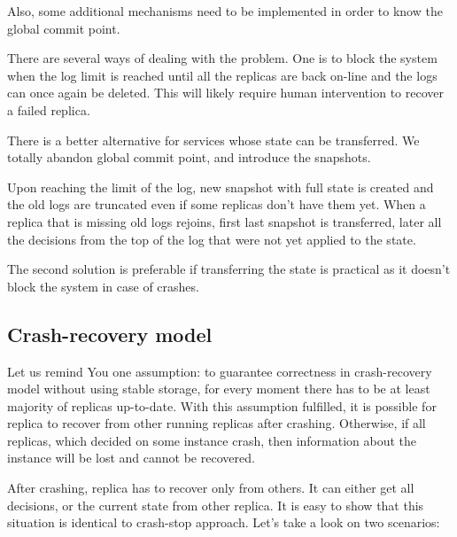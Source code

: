 Also, some additional mechanisms need to be implemented in order to know the global commit point.

There are several ways of dealing with the problem. One is to block the system when the log limit is reached until all the replicas are back on-line and the logs can once again be deleted. This will likely require human intervention to recover a failed replica.

There is a better alternative for services whose state can be transferred. We totally abandon global commit point, and introduce the snapshots.

Upon reaching the limit of the log, new snapshot with full state is created and the old logs are truncated even if some replicas don't have them yet. When a replica that is missing old logs rejoins, first last snapshot is transferred, later all the decisions from the top of the log that were not yet applied to the state.

The second solution is preferable if transferring the state is practical as it doesn't block the system in case of crashes.

\subsection{Crash-recovery model}
Let us remind You one assumption: to guarantee correctness in crash-recovery model without using stable storage, for every moment there has to be at least majority of replicas up-to-date. With this assumption fulfilled, it is possible for replica to recover from other running replicas after crashing. Otherwise, if all replicas, which decided on some instance crash, then information about the instance will be lost and cannot be recovered.

After crashing, replica has to recover only from others. It can either get all decisions, or the current state from other replica.
It is easy to show that this situation is identical to crash-stop approach. Let's take a look on two scenarios:

